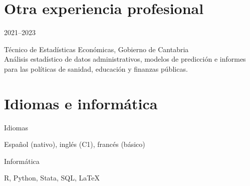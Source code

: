 \documentclass[11pt,a4paper]{article}
\newcommand{\entry}[2]{\begin{minipage}[t]{2.6cm}\sffamily\small\textcolor{muted}{#1}\end{minipage}%
  \begin{minipage}[t]{\linewidth-2.6cm}\raggedright #2\end{minipage}\par\vspace{4pt}}
\begin{document}
\section{Otra experiencia profesional}
\entry{2021–2023}{Técnico de Estadísticas Económicas, Gobierno de Cantabria\\{\small\color{muted}Análisis estadístico de datos administrativos, modelos de predicción e informes para las políticas de sanidad, educación y finanzas públicas.}}

\section{Idiomas e informática}
\entry{Idiomas}{Español (nativo), inglés (C1), francés (básico)}
\entry{Informática}{R, Python, Stata, SQL, LaTeX}
\end{document}
